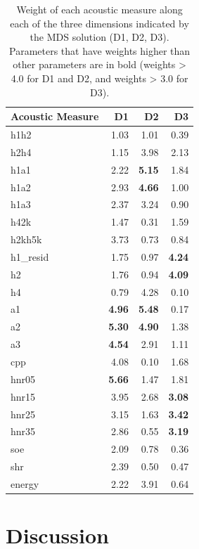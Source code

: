 \begin{table}[ht]
    \centering
    \caption{Weight of each acoustic measure along each of the three dimensions indicated by the MDS solution (D1, D2, D3). Parameters that have weights higher than other parameters are in bold (weights > 4.0 for D1 and D2, and weights > 3.0 for D3).} 
    \label{tab:acoustic_correlates}
    \begin{tabular}{lrrr}
    \hline
    Acoustic Measure & D1 & D2 & D3 \\ 
    \hline
    h1h2 & 1.03 & 1.01 & 0.39 \\ 
    h2h4 & 1.15 & 3.98 & 2.13 \\ 
    h1a1 & 2.22 & \textbf{5.15} & 1.84 \\ 
    h1a2 & 2.93 & \textbf{4.66} & 1.00 \\ 
    h1a3 & 2.37 & 3.24 & 0.90 \\ 
    h42k & 1.47 & 0.31 & 1.59 \\ 
    h2kh5k & 3.73 & 0.73 & 0.84 \\ 
    h1\_resid & 1.75 & 0.97 & \textbf{4.24} \\ 
    h2 & 1.76 & 0.94 & \textbf{4.09} \\ 
    h4 & 0.79 & 4.28 & 0.10 \\ 
    a1 & \textbf{4.96} & \textbf{5.48} & 0.17 \\ 
    a2 & \textbf{5.30} & \textbf{4.90} & 1.38 \\ 
    a3 & \textbf{4.54} & 2.91 & 1.11 \\ 
    cpp & 4.08 & 0.10 & 1.68 \\ 
    hnr05 & \textbf{5.66} & 1.47 & 1.81 \\ 
    hnr15 & 3.95 & 2.68 & \textbf{3.08} \\ 
    hnr25 & 3.15 & 1.63 & \textbf{3.42} \\ 
    hnr35 & 2.86 & 0.55 & \textbf{3.19} \\ 
    soe & 2.09 & 0.78 & 0.36 \\ 
    shr & 2.39 & 0.50 & 0.47 \\ 
    energy & 2.22 & 3.91 & 0.64 \\ 
    \hline
    \end{tabular}
\end{table}

\section{Discussion} \label{sec:acousticlandscape:discussion}

